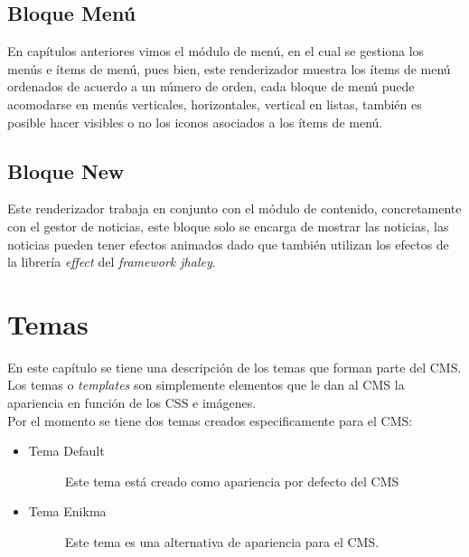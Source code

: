 \subsection{Bloque Men\'u}
En cap\'itulos anteriores vimos el m\'odulo de men\'u, en el cual se gestiona los men\'us e \'items de men\'u, pues bien, este renderizador muestra los \'items de men\'u ordenados de acuerdo a un n\'umero de orden, cada bloque de men\'u puede acomodarse en men\'us verticales, horizontales, vertical en listas, tambi\'en es posible hacer visibles o no los iconos asociados a los \'items de men\'u.

\subsection{Bloque New}
Este renderizador trabaja en conjunto con el m\'odulo de contenido, concretamente con el gestor de noticias, este bloque solo se encarga de mostrar las noticias, las noticias pueden tener efectos animados dado que tambi\'en utilizan los efectos de la librer\'ia \textit{effect} del \textit{framework jhaley}.

\section{Temas}
En este cap\'itulo se tiene una descripci\'on de los temas que forman parte del CMS. Los temas o \textit{templates} son simplemente elementos que le dan al CMS la apariencia en funci\'on de los CSS e im\'agenes.\\
Por el momento se tiene dos temas creados especificamente para el CMS:

\begin{itemize}
\item \begin{description}
	\item[Tema Default] Este tema est\'a creado como apariencia por defecto del CMS
\end{description}
\item \begin{description}
	\item[Tema Enikma] Este tema es una alternativa de apariencia para el CMS.
\end{description}
\end{itemize}

\clearpage

